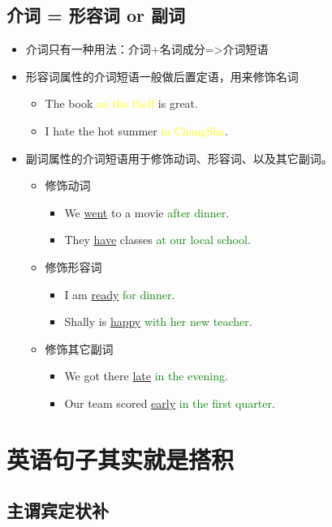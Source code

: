 \documentclass{ctexart}
\begin{document}
  \subsection{介词 = 形容词 or 副词}
  \begin{itemize}
    \item 介词只有一种用法：介词+名词成分=>介词短语
    \item 形容词属性的介词短语一般做后置定语，用来修饰名词
      \begin{itemize}
        \item The book \textcolor{yellow}{on the thelf} is great.
        \item I hate the hot summer \textcolor{yellow}{in ChangSha}.
      \end{itemize}
    \item 副词属性的介词短语用于修饰动词、形容词、以及其它副词。
      \begin{itemize}
        \item 修饰动词
          \begin{itemize}
            \item We \underline{went} to a movie \textcolor{green}{after dinner}.
            \item They \underline{have} classes \textcolor{green}{at our local school}.
          \end{itemize}
        \item 修饰形容词
          \begin{itemize}
            \item I am \underline{ready} \textcolor{green}{for dinner}.
            \item Shally is \underline{happy} \textcolor{green}{with her new teacher}.
          \end{itemize}
        \item 修饰其它副词
          \begin{itemize}
            \item We got there \underline{late} \textcolor{green}{in the evening}.
            \item Our team scored \underline{early} \textcolor{green}{in the first quarter}.
          \end{itemize}
      \end{itemize}
  \end{itemize}
  \section{英语句子其实就是搭积}
  \subsection{主谓宾定状补}
\end{document}
